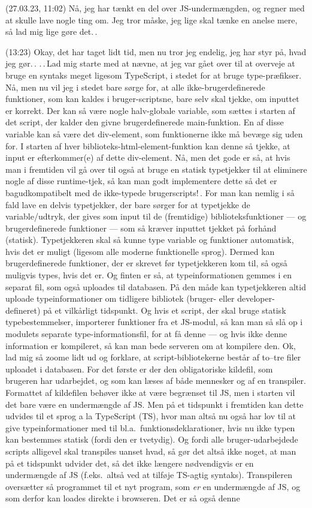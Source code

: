 \documentclass{report}
\begin{document}
(27.03.23, 11:02) Nå, jeg har tænkt en del over JS-undermængden, og regner med at skulle lave nogle ting om. Jeg tror måske, jeg lige skal tænke en anelse mere, så lad mig lige gøre det.\,. 

(13:23) Okay, det har taget lidt tid, men nu tror jeg endelig, jeg har styr på, hvad jeg gør.\,. .\,.\,Lad mig starte med at nævne, at jeg var gået over til at overveje at bruge en syntaks meget ligesom TypeScript, i stedet for at bruge type-præfikser. Nå, men nu vil jeg i stedet bare sørge for, at alle ikke-brugerdefinerede funktioner, som kan kaldes i bruger-scriptsne, bare selv skal tjekke, om inputtet er korrekt. Der kan så være nogle halv-globale variable, som sættes i starten af det script, der kalder den givne brugerdefinerede main-funktion. En af disse variable kan så være det div-element, som funktionerne ikke må bevæge sig uden for. I starten af hver biblioteks-html-element-funktion kan denne så tjekke, at input er efterkommer(e) af dette div-element. Nå, men det gode er så, at hvis man i fremtiden vil gå over til også at bruge en statisk typetjekker til at eliminere nogle af disse runtime-tjek, så kan man godt implementere dette så det er bagudkompatibelt med de ikke-typede brugerscripts!\,. For man kan nemlig i så fald lave en delvis typetjekker, der bare sørger for at typetjekke de variable/udtryk, der gives som input til de (fremtidige) biblioteksfunktioner --- og brugerdefinerede funktioner --- som så kræver inputtet tjekket på forhånd (statisk). Typetjekkeren skal så kunne type variable og funktioner automatisk, hvis det er muligt (ligesom alle moderne funktionelle sprog). Dermed kan brugerdefinerede funktioner, der er skrevet før typetjekkeren kom til, så også muligvis types, hvis det er. Og finten er så, at typeinformationen gemmes i en separat fil, som også uploades til databasen. På den måde kan typetjekkeren altid uploade typeinformationer om tidligere bibliotek (bruger- eller developer-defineret) på et vilkårligt tidspunkt. Og hvis et script, der skal bruge statisk typebestemmelser, importerer funktioner fra et JS-modul, så kan man så slå op i modulets separate type-informationsfil, for at få denne --- og hvis ikke denne information er kompileret, så kan man bede serveren om at kompilere den. Ok, lad mig så zoome lidt ud og forklare, at script-bibliotekerne består af to--tre filer uploadet i databasen. For det første er der den obligatoriske kildefil, som brugeren har udarbejdet, og som kan læses af både mennesker og af en transpiler. Formattet af kildefilen behøver ikke at være begrænset til JS, men i starten vil det bare være en undermængde af JS. Men på et tidspunkt i fremtiden kan dette udvides til et sprog a la TypeScript (TS), hvor man altså nu også har lov til at give typeinformationer med til bl.a.\ funktionsdeklarationer, hvis nu ikke typen kan bestemmes statisk (fordi den er tvetydig). Og fordi alle bruger-udarbejdede scripts alligevel skal transpiles uanset hvad, så gør det altså ikke noget, at man på et tidspunkt udvider det, så det ikke længere nødvendigvis er en undermængde af JS (f.eks.\ altså ved at tilføje TS-agtig syntaks). Transpileren oversætter så programmet til et nyt program, som \emph{er} en undermængde af JS, og som derfor kan loades direkte i browseren. Det er så også denne 
\end{document}
